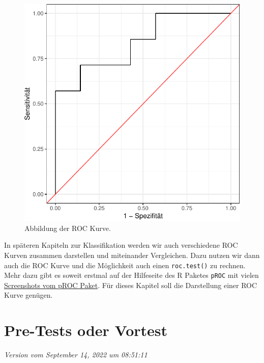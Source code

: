 \documentclass[
  letterpaper,
]{scrbook}
\begin{document}
\begin{figure}[H]

{\centering \includegraphics{./stat-tests-diagnostic_files/figure-pdf/fig-labels-roc2-1.pdf}

}

\caption{\label{fig-labels-roc2}Abbildung der ROC Kurve.}

\end{figure}

In späteren Kapiteln zur Klassifikation werden wir auch verschiedene ROC
Kurven zusammen darstellen und miteinander Vergleichen. Dazu nutzen wir
dann auch die ROC Kurve und die Möglichkeit auch einen
\texttt{roc.test()} zu rechnen. Mehr dazu gibt es soweit erstmal auf der
Hilfeseite des R Paketes \texttt{pROC} mit vielen
\href{https://web.expasy.org/pROC/screenshots.html}{Screenshots vom pROC
Paket}. Für dieses Kapitel soll die Darstellung einer ROC Kurve genügen.

\hypertarget{pre-tests-oder-vortest}{%
\chapter{Pre-Tests oder Vortest}\label{pre-tests-oder-vortest}}

\emph{Version vom September 14, 2022 um 08:51:11}
\end{document}
